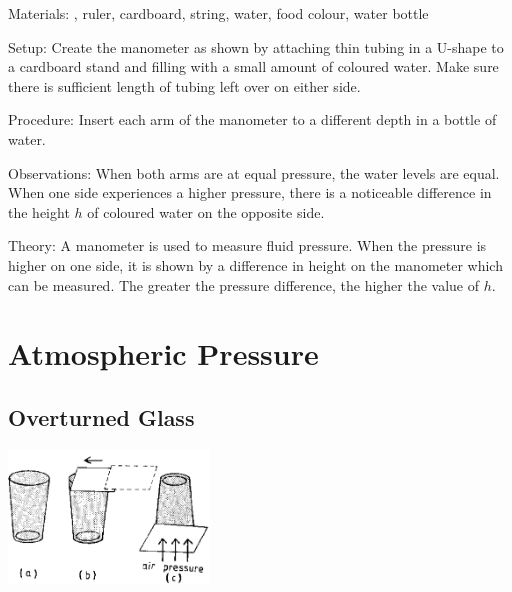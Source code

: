 \begin{multicols}{2}
\begin{description*}
\item[Materials:]{, ruler, cardboard, string, water, food colour, water bottle}
\item[Setup:]{Create the manometer as shown by attaching thin tubing in a U-shape to a cardboard stand and filling with a small amount of coloured water. Make sure there is sufficient length of tubing left over on either side.}
\item[Procedure:]{Insert each arm of the manometer to a different depth in a bottle of water.}
\item[Observations:]{When both arms are at equal pressure, the water levels are equal. When one side experiences a higher pressure, there is a noticeable difference in the height $h$ of coloured water on the opposite side.}
\item[Theory:]{A manometer is used to measure fluid pressure. When the pressure is higher on one side, it is shown by a difference in height on the manometer which can be measured. The greater the pressure difference, the higher the value of $h$.}
\end{description*}


\section*{Atmospheric Pressure} 
\label{sec:atm-pressure}


\subsection{Overturned Glass}

\begin{center}
\includegraphics[width=0.4\textwidth]{./img/source/overturned-glass.png}
\end{center}


\end{multicols}
